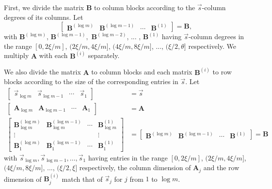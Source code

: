 \begin{pf}
First, we divide the matrix $\mathbf{B}$ to column blocks according
to the $\vec{s}$-column degrees of its columns. Let 
\[
\left[\begin{array}{cccc}
\mathbf{B}^{\left(\log m\right)} & \mathbf{B}^{\left(\log m-1\right)} & \cdots & \mathbf{B}^{\left(1\right)}\end{array}\right]=\mathbf{B},
\]
with $\mathbf{B}^{\left(\log m\right)}$, $\mathbf{B}^{\left(\log m-1\right)},$
$\mathbf{B}^{\left(\log m-2\right)}$, ... , $\mathbf{B}^{\left(1\right)}$
having $\vec{s}$-column degrees in the range $\left[0,2\xi/m\right]$,
$(2\xi/m,4\xi/m]$, $(4\xi/m,8\xi/m]$, ..., $(\xi/2,\theta]$ respectively.
We multiply $\mathbf{A}$ with each $\mathbf{B}^{\left(i\right)}$
separately. 

We also divide the matrix $\mathbf{A}$ to column blocks and each
matrix $\mathbf{B}^{\left(i\right)}$ to row blocks according to the
size of the corresponding entries in $\vec{s}$. Let 
\begin{align*}
\left[\begin{array}{cccc}
\vec{s}_{\log m} & \vec{s}_{\log m-1} & \cdots & \vec{s}_{1}\end{array}\right] & =\vec{s}\\
\left[\begin{array}{cccc}
\mathbf{A}_{\log m} & \mathbf{A}_{\log m-1} & \cdots & \mathbf{A}_{1}\end{array}\right] & =\mathbf{A}\\
\left[\begin{array}{cccc}
\mathbf{B}_{\log m}^{\left(\log m\right)} & \mathbf{B}_{\log m}^{\left(\log m-1\right)} & \cdots & \mathbf{B}_{\log m}^{\left(1\right)}\\
\vdots &  &  & \vdots\\
\mathbf{B}_{1}^{\left(\log m\right)} & \mathbf{B}_{1}^{\left(\log m-1\right)} & \cdots & \mathbf{B}_{1}^{\left(1\right)}
\end{array}\right] & =\left[\begin{array}{cccc}
\mathbf{B}^{\left(\log m\right)} & \mathbf{B}^{\left(\log m-1\right)} & \cdots & \mathbf{B}^{\left(1\right)}\end{array}\right]=\mathbf{B}
\end{align*}
 with $\vec{s}_{\log m},\vec{s}_{\log m-1},\dots,\vec{s}_{1}$ having
entries in the range $\left[0,2\xi/m\right]$, $(2\xi/m,4\xi/m]$,
$(4\xi/m,8\xi/m]$, ..., $(\xi/2,\xi]$ respectively, the column dimension
of $\mathbf{A}_{j}$ and the row dimension of $\mathbf{B}_{j}^{\left(i\right)}$
match that of $\vec{s}_{j}$ for $j$ from $1$ to $\log m$.


\end{pf}

